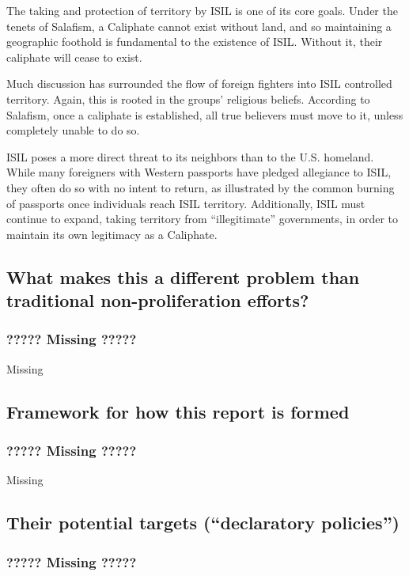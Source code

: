 \documentclass{report}
\begin{document}
The taking and protection of territory by ISIL is one of its core goals. Under the tenets of Salafism, a Caliphate cannot exist without land, and so maintaining a geographic foothold is fundamental to the existence of ISIL. Without it, their caliphate will cease to exist. 

Much discussion has surrounded the flow of foreign fighters into ISIL controlled territory. Again, this is rooted in the groups' religious beliefs. According to Salafism, once a caliphate is established, all true believers must move to it, unless completely unable to do so. 

ISIL poses a more direct threat to its neighbors than to the U.S. homeland. While many foreigners with Western passports have pledged allegiance to ISIL, they often do so with no intent to return, as illustrated by the common burning of passports once individuals reach ISIL territory. Additionally, ISIL must continue to expand, taking territory from \enquote{illegitimate} governments, in order to maintain its own legitimacy as a Caliphate. 


\subsection{What makes this a different problem than traditional non-proliferation efforts?}

\subsubsection{????? Missing ?????}

Missing


\subsection{Framework for how this report is formed}

\subsubsection{????? Missing ?????}

Missing


\subsection{Their potential targets (“declaratory policies”)}

\subsubsection{????? Missing ?????}
\end{document}
